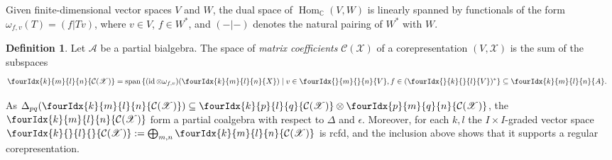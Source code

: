 \documentclass[10pt]{article}
\DeclareMathOperator{\id}{id}
\DeclareMathOperator{\Hom}{Hom}
\DeclareMathOperator{\Span}{\mathrm{span}}
\newcommand{\dual}[1]{#1^{*}}
\newcommand{\C}{\mathbb{C}}
\newcommand{\Gr}[5]{\fourIdx{#2}{#4}{#3}{#5}{#1}}%
\newcommand{\Gru}[3]{\Gr{#1}{}{}{#2}{#3}}
\newcommand{\Grd}[3]{\Gr{#1}{#2}{#3}{}{}}
\theoremstyle{definition}
\newtheorem{Def}[Theorem]{Definition}
\numberwithin{equation}{section}
\begin{document}
Given finite-dimensional vector spaces $V$ and $W$, the dual space of
$\Hom_{\C}(V,W)$ is linearly spanned by functionals of the form $\omega_{f,v}(T) =  (f|Tv)$, where $v\in V$, $f\in \dual{W}$, and $(-|-)$ denotes the natural
pairing of $\dual{W}$ with $W$.
\begin{Def} Let $\mathscr{A}$ be a partial bialgebra. The space of
  \emph{matrix coefficients} $\mathcal{C}(\mathscr{X})$ of a
  corepresentation $(V,\mathscr{X})$ is the sum of the subspaces
\begin{align*}
  \Gr{\mathcal{C}(\mathscr{X})}{k}{l}{m}{n} &= \Span \left\{ (\id \otimes
    \omega_{f,v})(\Gr{X}{k}{l}{m}{n}) \mid v\in \Gru{V}{m}{n}, f \in
    \dual{(\Gru{V}{k}{l})} \right\} \subseteq \Gr{A}{k}{l}{m}{n}.
\end{align*}
\end{Def}
As $\Delta_{pq}(\Gr{\mathcal{C}(\mathscr{X})}{k}{l}{m}{n}) \subseteq
  \Gr{\mathcal{C}(\mathscr{X})}{k}{l}{p}{q} \otimes
  \Gr{\mathcal{C}(\mathscr{X})}{p}{q}{m}{n}$, the $\Gr{\mathcal{C}(\mathscr{X})}{k}{l}{m}{n}$ form a partial
coalgebra with respect to $\Delta$ and $\epsilon$.  Moreover, for each
$k,l$ the $I\times I$-graded vector  space $\Grd{\mathcal{C}(\mathscr{X})}{k}{l}:=\bigoplus_{m,n }
  \Gr{\mathcal{C}(\mathscr{X})}{k}{l}{m}{n}$ is rcfd, and the inclusion above shows that it supports a regular corepresentation.
\end{document}
